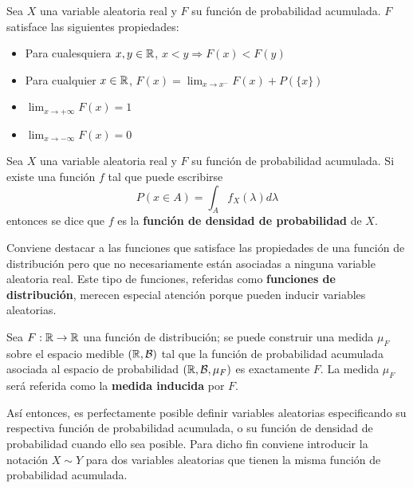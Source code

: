 \begin{proposicion}
Sea $X$ una variable aleatoria real y $F$ su función de probabilidad acumulada. $F$ satisface las siguientes propiedades:
\begin{itemize}
\item Para cualesquiera $x,y\in \mathbb{R}$, $x < y \Rightarrow F(x) < F(y)$
\item Para cualquier $x\in\mathbb{R}$, $F(x) = \lim_{x\rightarrow x^{-}} F(x) + P(\{x\})$
\item $\lim_{x\rightarrow +\infty} F(x) = 1$
\item $\lim_{x\rightarrow -\infty} F(x) = 0$
\end{itemize}
\end{proposicion}

\begin{definicion}
Sea $X$ una variable aleatoria real y $F$ su función de probabilidad acumulada. Si existe una función $f$  tal que puede escribirse
\begin{equation}
P(x\in A) = \int_A f_X(\lambda) d\lambda 
\end{equation}
entonces se dice que $f$ es la \textbf{función de densidad de probabilidad} de $X$.
\end{definicion}

Conviene destacar a las funciones que satisface las propiedades de una función de distribución pero que no necesariamente están asociadas a ninguna variable aleatoria real.
%
Este tipo de funciones, referidas como \textbf{funciones de distribución}, merecen especial atención porque pueden inducir variables aleatorias.

\begin{proposicion}
Sea $F:\mathbb{R} \rightarrow \mathbb{R}$ una función de distribución; se puede construir una medida $\mu_F$ sobre el espacio medible $(\mathbb{R}, \mathcal{B})$ tal que la función de probabilidad acumulada asociada al espacio de probabilidad $(\mathbb{R}, \mathcal{B}, \mu_F)$ es exactamente $F$.
%
La medida $\mu_F$ será referida como la \textbf{medida inducida} por $F$.
\end{proposicion}

Así entonces, es perfectamente posible definir variables aleatorias especificando su respectiva función de probabilidad acumulada, o su función de densidad de probabilidad cuando ello sea posible.
%
Para dicho fin conviene introducir la notación $X \sim Y$ para dos variables aleatorias que tienen la misma función de probabilidad acumulada.

